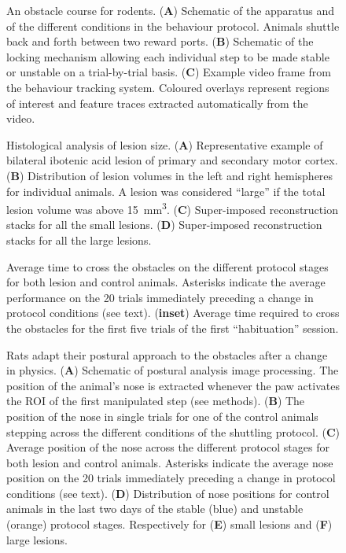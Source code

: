 
\begin{figure}
\centering

\caption{An obstacle course for rodents. (\textbf{A}) Schematic of the apparatus and of the different conditions in the behaviour protocol. Animals shuttle back and forth between two reward ports. (\textbf{B}) Schematic of the locking mechanism allowing each individual step to be made stable or unstable on a trial-by-trial basis. (\textbf{C}) Example video frame from the behaviour tracking system. Coloured overlays represent regions of interest and feature traces extracted automatically from the video. }
\label{fig:assay}
\end{figure}

\begin{figure}
\centering

\caption{Histological analysis of lesion size. (\textbf{A}) Representative example of bilateral ibotenic acid lesion of primary and secondary motor cortex. (\textbf{B}) Distribution of lesion volumes in the left and right hemispheres for individual animals. A lesion was considered ``large'' if the total lesion volume was above \SI{15}{\milli\meter\cubed}. (\textbf{C}) Super-imposed reconstruction stacks for all the small lesions. (\textbf{D}) Super-imposed reconstruction stacks for all the large lesions.}
\label{fig:histology}
\end{figure}

\begin{figure}
\centering

\caption{Average time to cross the obstacles on the different protocol stages for both lesion and control animals. Asterisks indicate the average performance on the 20 trials immediately preceding a change in protocol conditions (see text). (\textbf{inset}) Average time required to cross the obstacles for the first five trials of the first ``habituation'' session.}
\label{fig:learning}
\end{figure}

\begin{figure}
\centering

\caption{Rats adapt their postural approach to the obstacles after a change in physics. (\textbf{A}) Schematic of postural analysis image processing. The position of the animal's nose is extracted whenever the paw activates the ROI of the first manipulated step (see methods). (\textbf{B}) The position of the nose in single trials for one of the control animals stepping across the different conditions of the shuttling protocol. (\textbf{C}) Average position of the nose across the different protocol stages for both lesion and control animals. Asterisks indicate the average nose position on the 20 trials immediately preceding a change in protocol conditions (see text). (\textbf{D}) Distribution of nose positions for control animals in the last two days of the stable (blue) and unstable (orange) protocol stages. Respectively for (\textbf{E}) small lesions and (\textbf{F}) large lesions.}
\label{fig:posture}
\end{figure}

